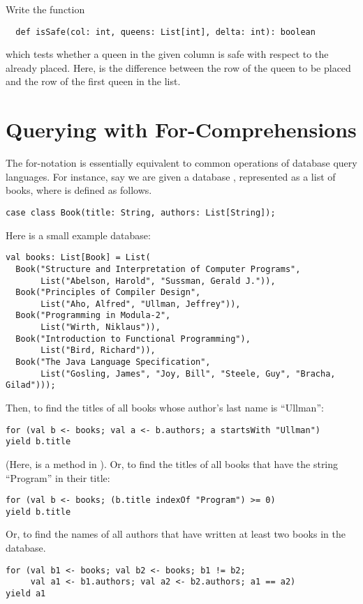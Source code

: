 \begin{exercise} Write the function
\begin{lstlisting}
  def isSafe(col: int, queens: List[int], delta: int): boolean
\end{lstlisting}
which tests whether a queen in the given column \verb@col@ is safe with 
respect to the \verb@queens@ already placed. Here, \verb@delta@ is the difference between the row of the queen to be
placed and the row of the first queen in the list.
\end{exercise}

\section{Querying with For-Comprehensions}

The for-notation is essentially equivalent to common operations of
database query languages.  For instance, say we are given a 
database , represented as a list of books, where
 is defined as follows.
\begin{lstlisting}
case class Book(title: String, authors: List[String]);
\end{lstlisting}
Here is a small example database:
\begin{lstlisting}
val books: List[Book] = List(
  Book("Structure and Interpretation of Computer Programs",
       List("Abelson, Harold", "Sussman, Gerald J.")),
  Book("Principles of Compiler Design",
       List("Aho, Alfred", "Ullman, Jeffrey")),
  Book("Programming in Modula-2",
       List("Wirth, Niklaus")),
  Book("Introduction to Functional Programming"),
       List("Bird, Richard")),
  Book("The Java Language Specification",
       List("Gosling, James", "Joy, Bill", "Steele, Guy", "Bracha, Gilad")));
\end{lstlisting}
Then, to find the titles of all books whose author's last name is ``Ullman'':
\begin{lstlisting}
for (val b <- books; val a <- b.authors; a startsWith "Ullman")
yield b.title
\end{lstlisting}
(Here,  is a method in ).  Or,
to find the titles of all books that have the string ``Program'' in
their title:
\begin{lstlisting}
for (val b <- books; (b.title indexOf "Program") >= 0)
yield b.title
\end{lstlisting}
Or, to find the names of all authors that have written at least two
books in the database.
\begin{lstlisting}
for (val b1 <- books; val b2 <- books; b1 != b2;
     val a1 <- b1.authors; val a2 <- b2.authors; a1 == a2)
yield a1
\end{lstlisting}

